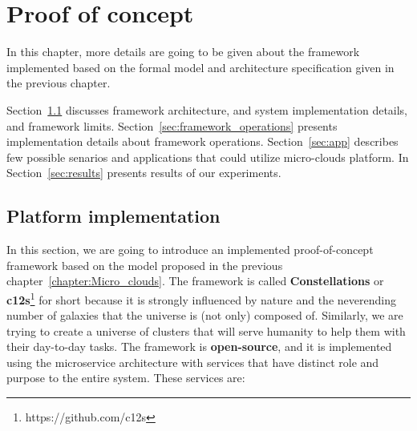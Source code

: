 \chapter{Proof of concept}\label{chapter:Implementation}
%
In this chapter, more details are going to be given about the framework implemented based on the formal model and architecture specification given in the previous chapter.

Section~\ref{sec:framework} discusses framework architecture, and system implementation details, and framework limits. Section~\ref{sec:framework_operations} presents implementation details about framework operations. Section~\ref{sec:app} describes few possible senarios and applications that could utilize micro-clouds platform. In Section~\ref{sec:results} presents results of our experiments.
%
%
\section{Platform implementation}\label{sec:framework}
%
In this section, we are going to introduce an implemented proof-of-concept framework based on the model proposed in the previous chapter~\ref{chapter:Micro_clouds}. The framework is called \textbf{Constellations} or \textbf{c12s}\footnote{https://github.com/c12s} for short because it is strongly influenced by nature and the neverending number of galaxies that the universe is (not only) composed of. Similarly, we are trying to create a universe of clusters that will serve humanity to help them with their day-to-day tasks. The framework is \textbf{open-source}, and it is implemented using the microservice architecture with services that have distinct role and purpose to the entire system. These services are:

